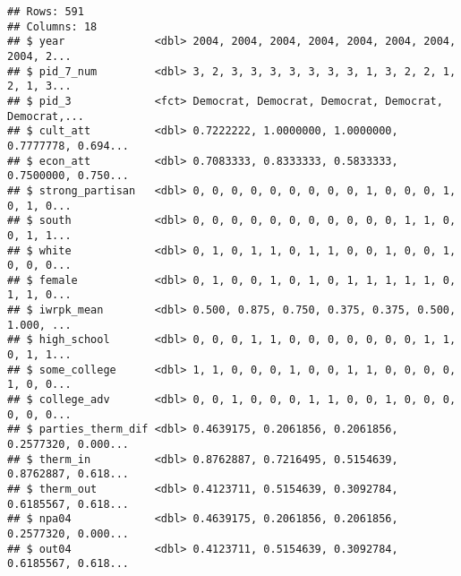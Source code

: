 \documentclass[
]{article}
\newenvironment{Shaded}{\begin{snugshade}}{\end{snugshade}}
\newcommand{\DataTypeTok}[1]{\textcolor[rgb]{0.13,0.29,0.53}{#1}}
\newcommand{\DecValTok}[1]{\textcolor[rgb]{0.00,0.00,0.81}{#1}}
\newcommand{\KeywordTok}[1]{\textcolor[rgb]{0.13,0.29,0.53}{\textbf{#1}}}
\newcommand{\NormalTok}[1]{#1}
\newcommand{\OperatorTok}[1]{\textcolor[rgb]{0.81,0.36,0.00}{\textbf{#1}}}
\newcommand{\StringTok}[1]{\textcolor[rgb]{0.31,0.60,0.02}{#1}}
\begin{document}
\begin{verbatim}
## Rows: 591
## Columns: 18
## $ year              <dbl> 2004, 2004, 2004, 2004, 2004, 2004, 2004, 2004, 2...
## $ pid_7_num         <dbl> 3, 2, 3, 3, 3, 3, 3, 3, 3, 1, 3, 2, 2, 1, 2, 1, 3...
## $ pid_3             <fct> Democrat, Democrat, Democrat, Democrat, Democrat,...
## $ cult_att          <dbl> 0.7222222, 1.0000000, 1.0000000, 0.7777778, 0.694...
## $ econ_att          <dbl> 0.7083333, 0.8333333, 0.5833333, 0.7500000, 0.750...
## $ strong_partisan   <dbl> 0, 0, 0, 0, 0, 0, 0, 0, 0, 1, 0, 0, 0, 1, 0, 1, 0...
## $ south             <dbl> 0, 0, 0, 0, 0, 0, 0, 0, 0, 0, 0, 1, 1, 0, 0, 1, 1...
## $ white             <dbl> 0, 1, 0, 1, 1, 0, 1, 1, 0, 0, 1, 0, 0, 1, 0, 0, 0...
## $ female            <dbl> 0, 1, 0, 0, 1, 0, 1, 0, 1, 1, 1, 1, 1, 0, 1, 1, 0...
## $ iwrpk_mean        <dbl> 0.500, 0.875, 0.750, 0.375, 0.375, 0.500, 1.000, ...
## $ high_school       <dbl> 0, 0, 0, 1, 1, 0, 0, 0, 0, 0, 0, 0, 1, 1, 0, 1, 1...
## $ some_college      <dbl> 1, 1, 0, 0, 0, 1, 0, 0, 1, 1, 0, 0, 0, 0, 1, 0, 0...
## $ college_adv       <dbl> 0, 0, 1, 0, 0, 0, 1, 1, 0, 0, 1, 0, 0, 0, 0, 0, 0...
## $ parties_therm_dif <dbl> 0.4639175, 0.2061856, 0.2061856, 0.2577320, 0.000...
## $ therm_in          <dbl> 0.8762887, 0.7216495, 0.5154639, 0.8762887, 0.618...
## $ therm_out         <dbl> 0.4123711, 0.5154639, 0.3092784, 0.6185567, 0.618...
## $ npa04             <dbl> 0.4639175, 0.2061856, 0.2061856, 0.2577320, 0.000...
## $ out04             <dbl> 0.4123711, 0.5154639, 0.3092784, 0.6185567, 0.618...
\end{verbatim}

\begin{Shaded}
\end{Shaded}
\end{document}
